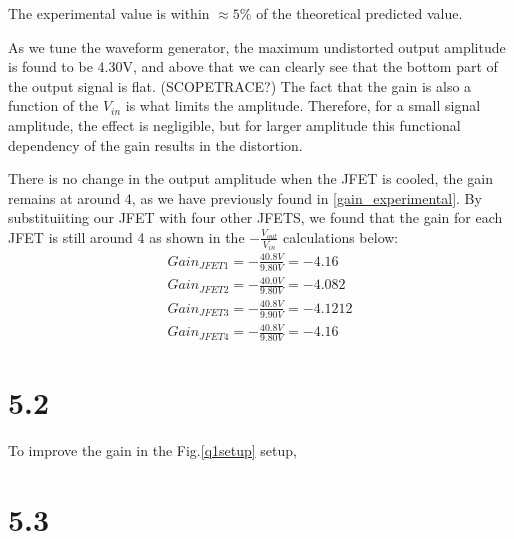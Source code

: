 \documentclass[authoryear, 12pt,5p, times]{elsarticle}
\begin{document}
The experimental value is within $\approx 5\%$ of the theoretical predicted value.
\par As we tune the waveform generator, the maximum undistorted output amplitude is found to be 4.30V, and above that we can clearly see that the bottom part of the output signal is flat. (SCOPETRACE?)  The fact that the gain is also a function of the $V_{in}$ is what limits the amplitude. Therefore, for a small signal amplitude, the effect is negligible, but for larger amplitude this functional dependency of the gain results in the distortion.  
\par There is no change in the output amplitude when the JFET is cooled, the gain remains at around 4, as we have previously found in \ref{gain_experimental}. By substituiiting our JFET with four other JFETS, we found that the gain for each JFET is still around 4 as shown in the $- \frac{V_{out}}{V_{in}}$ calculations below: 
\begin{align*}
Gain_{JFET1}= -\frac{40.8V}{9.80V}=-4.16
\\ Gain_{JFET2}=  -\frac{40.0V}{9.80V}=-4.082
\\ Gain_{JFET3}=  -\frac{40.8V}{9.90V}=-4.1212
\\ Gain_{JFET4}=  -\frac{40.8V}{9.80V}=-4.16
\end{align*}
\section*{5.2}
To improve the gain in the Fig.\ref{q1setup} setup,
\section*{5.3}
\end{document}

